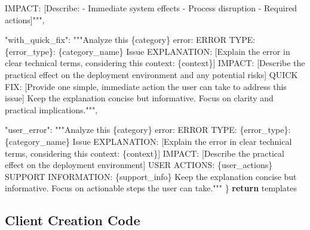 \documentclass[
  a4paper,
  12pt,
  oneside,
  open=any,
  BCOR=12mm,
  DIV=14,
  parskip=half*,
  headsepline,
  footsepline,
  pointlessnumbers,
  liststotoc,
  numbers=noenddot,
  listof=totoc]{scrartcl}
\newenvironment{Shaded}{\begin{snugshade}}{\end{snugshade}}
\newcommand{\ControlFlowTok}[1]{\textcolor[rgb]{0.00,0.23,0.31}{\textbf{#1}}}
\newcommand{\NormalTok}[1]{\textcolor[rgb]{0.00,0.23,0.31}{#1}}
\newcommand{\SpecialCharTok}[1]{\textcolor[rgb]{0.37,0.37,0.37}{#1}}
\newcommand{\StringTok}[1]{\textcolor[rgb]{0.13,0.47,0.30}{#1}}
\begin{document}
\begin{Shaded}
\begin{Highlighting}[]
\StringTok{            IMPACT:}
\StringTok{            [Describe:}
\StringTok{            {-} Immediate system effects}
\StringTok{            {-} Process disruption}
\StringTok{            {-} Required actions]"""}\NormalTok{,}

            \StringTok{"with\_quick\_fix"}\NormalTok{: }\StringTok{"""Analyze this }\SpecialCharTok{\{category\}}\StringTok{ error:}
\StringTok{            ERROR TYPE:}
\StringTok{            }\SpecialCharTok{\{error\_type\}}\StringTok{: }\SpecialCharTok{\{category\_name\}}\StringTok{ Issue}
\StringTok{            EXPLANATION:}
\StringTok{            [Explain the error in clear technical terms, }
\StringTok{            considering this context: }\SpecialCharTok{\{context\}}\StringTok{]}
\StringTok{            IMPACT:}
\StringTok{            [Describe the practical effect on the deployment }
\StringTok{            environment and any potential risks]}
\StringTok{            QUICK FIX:}
\StringTok{            [Provide one simple, immediate action the user }
\StringTok{            can take to address this issue]}
\StringTok{            Keep the explanation concise but informative. }
\StringTok{            Focus on clarity and practical implications."""}\NormalTok{,}

            \StringTok{"user\_error"}\NormalTok{: }\StringTok{"""Analyze this }\SpecialCharTok{\{category\}}\StringTok{ error:}
\StringTok{            ERROR TYPE:}
\StringTok{            }\SpecialCharTok{\{error\_type\}}\StringTok{: }\SpecialCharTok{\{category\_name\}}\StringTok{ Issue}
\StringTok{            EXPLANATION:}
\StringTok{            [Explain the error in clear technical terms, }
\StringTok{            considering this context: }\SpecialCharTok{\{context\}}\StringTok{]}
\StringTok{            IMPACT:}
\StringTok{            [Describe the practical effect on the }
\StringTok{            deployment environment]}
\StringTok{            USER ACTIONS:}
\StringTok{            }\SpecialCharTok{\{user\_actions\}}
\StringTok{            SUPPORT INFORMATION:}
\StringTok{            }\SpecialCharTok{\{support\_info\}}
\StringTok{            Keep the explanation concise but informative. }
\StringTok{            Focus on actionable steps the user can take."""}
\NormalTok{        \}}
        \ControlFlowTok{return}\NormalTok{ templates}
\end{Highlighting}
\end{Shaded}

\newpage

\subsection{Client Creation Code}\label{client-creation-code}
\end{document}
